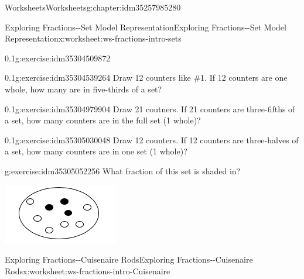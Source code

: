 \documentclass[twoside,11pt,]{book}
\begin{document}
\begin{chapterptx}{Worksheets}{}{Worksheets}{}{}{g:chapter:idm35257985280}
\begin{worksheet-section-numberless}{Exploring Fractions-{}-{}Set Model Representation}{}{Exploring Fractions-{}-{}Set Model Representation}{}{}{x:worksheet:ws-fractions-intro-sets}
\begin{divisionexercise}{1}{}{0.1}{g:exercise:idm35304509872}
\begin{sidebyside}{1}{0.35}{0.35}{0}
\begin{sbspanel}{0.3}
\end{sbspanel}%
\end{sidebyside}%
%
\end{divisionexercise}%
\begin{divisionexercise}{2}{}{0.1}{g:exercise:idm35304539264}%
Draw 12 counters like \#1. If 12 counters are one whole, how many are in five-thirds of a set?%
\end{divisionexercise}%
\begin{divisionexercise}{3}{}{0.1}{g:exercise:idm35304979904}%
Draw 21 coutners. If 21 counters are three-fifths of a set, how many counters are in the full set (1 whole)?%
\end{divisionexercise}%
\begin{divisionexercise}{4}{}{0.1}{g:exercise:idm35305030048}%
Draw 12 counters. If 12 counters are three-halves of a set, how many counters are in one set (1 whole)?%
\end{divisionexercise}%
\begin{divisionexercise}{5}{}{}{g:exercise:idm35305052256}%
What fraction of this set is shaded in? \begin{sidebyside}{1}{0.35}{0.35}{0}%
\begin{sbspanel}{0.3}%
\includegraphics[width=1\linewidth]{images/counters-one-third.png}
\end{sbspanel}%
\end{sidebyside}%
%
\end{divisionexercise}%
\end{worksheet-section-numberless}
\restoregeometry
%
%
\typeout{************************************************}
\typeout{************************************************}
%
\begin{worksheet-section-numberless}{Exploring Fractions-{}-{}Cuisenaire Rods}{}{Exploring Fractions-{}-{}Cuisenaire Rods}{}{}{x:worksheet:ws-fractions-intro-Cuisenaire}

\end{worksheet-section-numberless}
\end{chapterptx}
\end{document}
